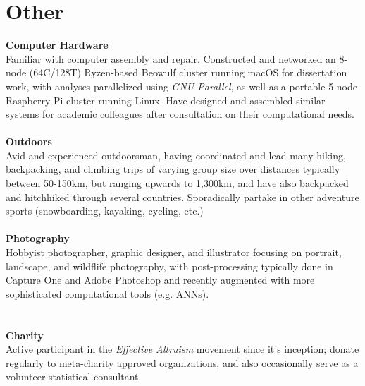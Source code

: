 \documentclass[12pt]{article}
\begin{document}
\section{Other}
\textbf{Computer Hardware}\\ Familiar with computer assembly and repair. Constructed and networked an 8-node (64C/128T) Ryzen-based Beowulf cluster running macOS for dissertation work, with analyses parallelized using \emph{GNU Parallel}, as well as a portable 5-node Raspberry Pi cluster running Linux. Have designed and assembled similar systems for academic colleagues after consultation on their computational needs.\\\\
\textbf{Outdoors}\\ Avid and experienced outdoorsman, having coordinated and lead many hiking, backpacking, and climbing trips of varying group size over distances typically between 50-150km, but ranging upwards to 1,300km, and have also backpacked and hitchhiked through several countries. Sporadically partake in other adventure sports (snowboarding, kayaking, cycling, etc.) \\\\
\textbf{Photography}\\ Hobbyist photographer, graphic designer, and illustrator focusing on portrait, landscape, and wildflife photography, with post-processing typically done in Capture One and Adobe Photoshop and recently augmented with more sophisticated computational tools (e.g. ANNs).\\\\
\vspace{1cm}\\
\textbf{Charity}\\ Active participant in the \emph{Effective Altruism} movement since it's inception; donate regularly to meta-charity approved organizations, and also occasionally serve as a volunteer statistical consultant.\\\\

\end{document}
